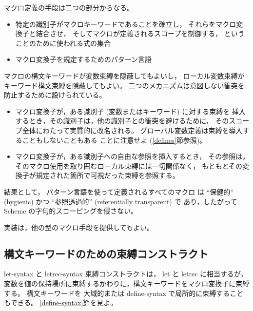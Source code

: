 マクロ定義の手段は二つの部分からなる。

\begin{itemize}
\item 特定の識別子がマクロキーワードであることを確立し，
それらをマクロ変換子と結合させ，
そしてマクロが定義されるスコープを制御する，
ということのために使われる式の集合

\item マクロ変換子を規定するためのパターン言語
\end{itemize}

マクロの構文キーワードが変数束縛を隠蔽してもよいし，
ローカル変数束縛がキーワード構文束縛を隠蔽してもよい。
二つのメカニズムは意図しない衝突を防止するために設けられている。

\begin{itemize}

\item マクロ変換子が，ある識別子 (変数またはキーワード) に対する束縛を
挿入するとき，その識別子は，他の識別子との衝突を避けるために，
そのスコープ全体にわたって実質的に改名される。
グローバル変数定義は束縛を導入することもしないこともある
ことに注意せよ (\ref{defines}節参照)。

\item マクロ変換子が，ある識別子への自由な参照を挿入するとき，
その参照は，そのマクロ使用を取り囲むローカル束縛には一切関係なく，
もともとその変換子が規定された箇所で可視だった束縛を参照する。

\end{itemize}

結果として，
パターン言語を使って定義されるすべてのマクロ
は ``保健的'' (hygienic) かつ ``参照透過的'' (referentially transparent) で
あり，したがって Scheme の字句的スコーピングを侵さない。\cite{Kohlbecker86,
hygienic,Bawden88,macrosthatwork,syntacticabstraction}

実装は，他の型のマクロ手段を提供してもよい。

\subsection{構文キーワードのための束縛コンストラクト}
\label{bindsyntax}

{\cf let-syntax} と {\cf letrec-syntax} 束縛コンストラクトは，
{\cf let} と {\cf letrec} に相当するが，
変数を値の保持場所に束縛するかわりに，構文キーワードをマクロ変換子に束縛する。
構文キーワードを
大域的または {\cf define-syntax} で局所的に束縛することもできる。
\ref{define-syntax}節を見よ。

